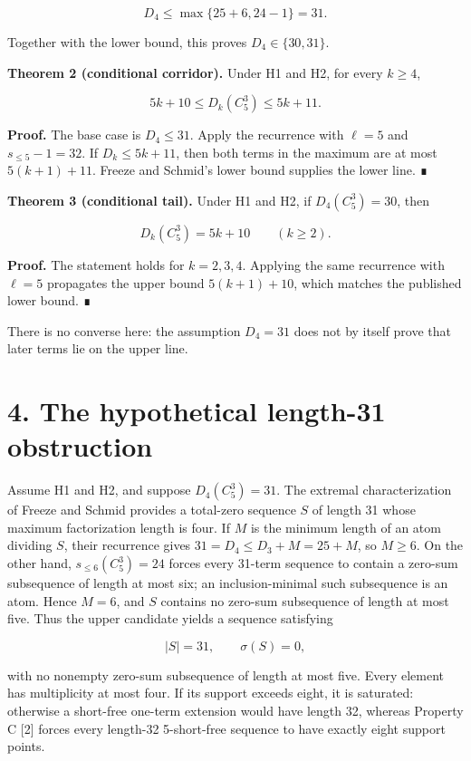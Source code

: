 \documentclass[
  11pt,
]{article}
\begin{document}
\[
D_4\le\max\{25+6,24-1\}=31.
\]

Together with the lower bound, this proves \(D_4\in\{30,31\}\).

\textbf{Theorem 2 (conditional corridor).} Under H1 and H2, for every
\(k\ge4\),

\[
5k+10\le D_k(C_5^3)\le5k+11.
\]

\textbf{Proof.} The base case is \(D_4\le31\). Apply the recurrence with
\(\ell=5\) and \(s_{\le5}-1=32\). If \(D_k\le5k+11\), then both terms in
the maximum are at most \(5(k+1)+11\). Freeze and Schmid's lower bound
supplies the lower line. ∎

\textbf{Theorem 3 (conditional tail).} Under H1 and H2, if
\(D_4(C_5^3)=30\), then

\[
D_k(C_5^3)=5k+10
\qquad(k\ge2).
\]

\textbf{Proof.} The statement holds for \(k=2,3,4\). Applying the same
recurrence with \(\ell=5\) propagates the upper bound \(5(k+1)+10\),
which matches the published lower bound. ∎

There is no converse here: the assumption \(D_4=31\) does not by itself
prove that later terms lie on the upper line.

\hypertarget{the-hypothetical-length-31-obstruction}{%
\section{4. The hypothetical length-31
obstruction}\label{the-hypothetical-length-31-obstruction}}

Assume H1 and H2, and suppose \(D_4(C_5^3)=31\). The extremal
characterization of Freeze and Schmid provides a total-zero sequence
\(S\) of length 31 whose maximum factorization length is four. If \(M\)
is the minimum length of an atom dividing \(S\), their recurrence gives
\(31=D_4\le D_3+M=25+M\), so \(M\ge6\). On the other hand,
\(s_{\le6}(C_5^3)=24\) forces every 31-term sequence to contain a
zero-sum subsequence of length at most six; an inclusion-minimal such
subsequence is an atom. Hence \(M=6\), and \(S\) contains no zero-sum
subsequence of length at most five. Thus the upper candidate yields a
sequence satisfying

\[
|S|=31, \qquad \sigma(S)=0,
\]

with no nonempty zero-sum subsequence of length at most five. Every
element has multiplicity at most four. If its support exceeds eight, it
is saturated: otherwise a short-free one-term extension would have
length 32, whereas Property C {[}2{]} forces every length-32
5-short-free sequence to have exactly eight support points.
\end{document}
